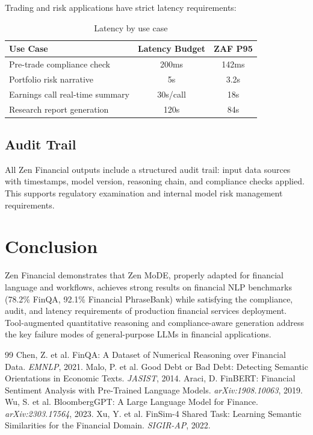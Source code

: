 \documentclass[11pt,a4paper]{article}
\begin{document}
Trading and risk applications have strict latency requirements:

\begin{table}[H]
\centering
\caption{Latency by use case}
\label{tab:latency}
\begin{tabular}{lcc}
\toprule
Use Case & Latency Budget & ZAF P95 \\
\midrule
Pre-trade compliance check & 200ms & 142ms \\
Portfolio risk narrative & 5s & 3.2s \\
Earnings call real-time summary & 30s/call & 18s \\
Research report generation & 120s & 84s \\
\bottomrule
\end{tabular}
\end{table}

\subsection{Audit Trail}

All Zen Financial outputs include a structured audit trail: input data sources with timestamps, model version, reasoning chain, and compliance checks applied. This supports regulatory examination and internal model risk management requirements.

\section{Conclusion}

Zen Financial demonstrates that Zen MoDE, properly adapted for financial language and workflows, achieves strong results on financial NLP benchmarks (78.2\% FinQA, 92.1\% Financial PhraseBank) while satisfying the compliance, audit, and latency requirements of production financial services deployment. Tool-augmented quantitative reasoning and compliance-aware generation address the key failure modes of general-purpose LLMs in financial applications.

\begin{thebibliography}{99}
 Chen, Z. et al. FinQA: A Dataset of Numerical Reasoning over Financial Data. \textit{EMNLP}, 2021.
 Malo, P. et al. Good Debt or Bad Debt: Detecting Semantic Orientations in Economic Texts. \textit{JASIST}, 2014.
 Araci, D. FinBERT: Financial Sentiment Analysis with Pre-Trained Language Models. \textit{arXiv:1908.10063}, 2019.
 Wu, S. et al. BloombergGPT: A Large Language Model for Finance. \textit{arXiv:2303.17564}, 2023.
 Xu, Y. et al. FinSim-4 Shared Task: Learning Semantic Similarities for the Financial Domain. \textit{SIGIR-AP}, 2022.
\end{thebibliography}
\end{document}
